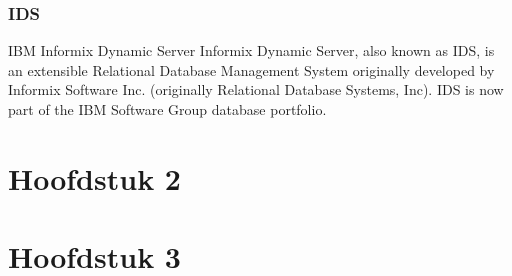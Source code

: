 \documentclass[12pt]{article}
\begin{document}
\subsubsection{IDS}
IBM Informix Dynamic Server
Informix Dynamic Server, also known as IDS, is an extensible Relational Database Management System originally developed by Informix Software Inc. (originally Relational Database Systems, Inc). IDS is now part of the IBM Software Group database portfolio.
\section{Hoofdstuk 2}
\lipsum[0-4]
\section{Hoofdstuk 3}
\lipsum[0-4]
\clearpage 
\end{document}

